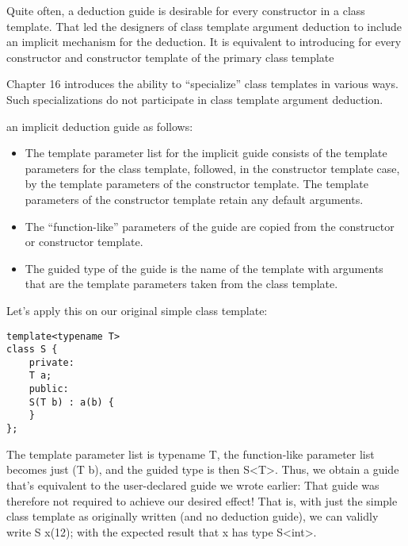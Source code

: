 
Quite often, a deduction guide is desirable for every constructor in a class template. That led the designers of class template argument deduction to include an implicit mechanism for the deduction. It is equivalent to introducing for every constructor and constructor template of the primary class template 

\begin{tcolorbox}[colback=webgreen!5!white,colframe=webgreen!75!black]
\hspace*{0.75cm}Chapter 16 introduces the ability to “specialize” class templates in various ways. Such specializations do not participate in class template argument deduction.
\end{tcolorbox}

an implicit deduction guide as follows:

\begin{itemize}
\item 
The template parameter list for the implicit guide consists of the template parameters for the class template, followed, in the constructor template case, by the template parameters of the constructor template. The template parameters of the constructor template retain any default arguments.

\item 
The “function-like” parameters of the guide are copied from the constructor or constructor template.

\item 
The guided type of the guide is the name of the template with arguments that are the template parameters taken from the class template.
\end{itemize}	

Let’s apply this on our original simple class template:

\begin{lstlisting}[style=styleCXX]
template<typename T>
class S {
	private:
	T a;
	public:
	S(T b) : a(b) {
	}
};
\end{lstlisting}

The template parameter list is typename T, the function-like parameter list becomes just (T b), and the guided type is then S<T>. Thus, we obtain a guide that’s equivalent to the user-declared guide we wrote earlier: That guide was therefore not required to achieve our desired effect! That is, with just the simple class template as originally written (and no deduction guide), we can validly write S x(12); with the expected result that x has type S<int>.

